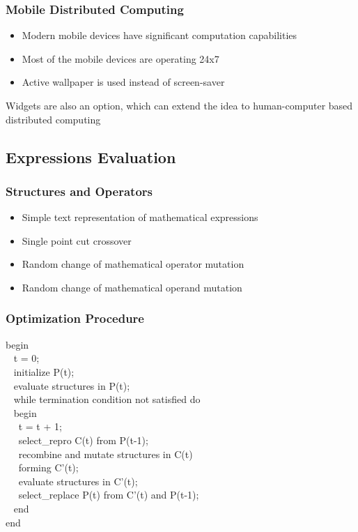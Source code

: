 \documentclass{beamer}
\begin{document}
\begin{frame}
\frametitle{Mobile Distributed Computing}
\begin{itemize}
	\item Modern mobile devices have significant computation capabilities
	\item Most of the mobile devices are operating 24x7
	\item Active wallpaper is used instead of screen-saver
\end{itemize}
Widgets are also an option, which can extend the idea to human-computer based distributed computing
\end{frame}

\subsection{Expressions Evaluation}

\begin{frame}
\frametitle{Structures and Operators}
\begin{itemize}
	\item Simple text representation of mathematical expressions
	\item Single point cut crossover
	\item Random change of mathematical operator mutation
	\item Random change of mathematical operand mutation
\end{itemize}
\end{frame}

\begin{frame}
\frametitle{Optimization Procedure}
\small
begin \\
~  t = 0; \\
~  initialize P(t); \\
~  evaluate structures in P(t); \\
~  while termination condition not satisfied do \\
~  begin \\
~~    t = t + 1; \\
~~    select\_repro C(t) from P(t-1); \\
~~    recombine and mutate structures in C(t) \\
~~    forming C'(t); \\
~~    evaluate structures in C'(t); \\
~~    select\_replace P(t) from C'(t) and P(t-1); \\
~  end \\
end \\
\end{frame}
\end{document}
